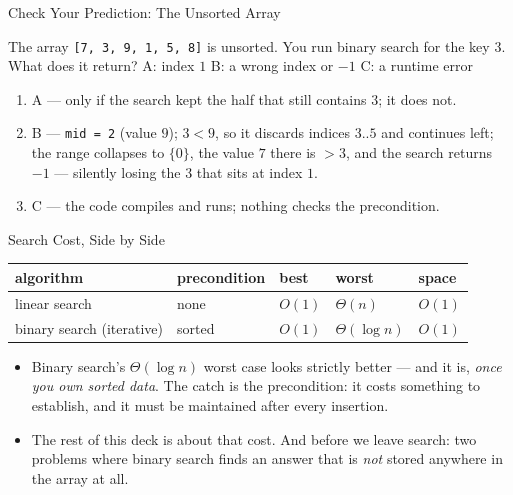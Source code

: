 \documentclass[aspectratio=169]{beamer}
\begin{document}
\begin{frame}{Check Your Prediction: The Unsorted Array}
  \begin{block}{The array \texttt{[7, 3, 9, 1, 5, 8]} is unsorted. You run
    binary search for the key $3$. What does it return?}
    A: index $1$ \quad B: a wrong index or $-1$ \quad C: a runtime error
  \end{block}
  \begin{enumerate}
    \item A --- only if the search kept the half that still contains $3$; it
      does not.
    \item B --- \texttt{mid = 2} (value $9$); $3 < 9$, so it discards indices
      $3..5$ and continues left; the range collapses to $\{0\}$, the value $7$
      there is $> 3$, and the search returns $-1$ --- silently losing the $3$
      that sits at index $1$.
    \item C --- the code compiles and runs; nothing checks the precondition.
  \end{enumerate}
\end{frame}

\begin{frame}{Search Cost, Side by Side}
  \begin{center}
  {\footnotesize
  \begin{tabular}{lllll}
    \toprule
    \textbf{algorithm} & \textbf{precondition} & \textbf{best} &
      \textbf{worst} & \textbf{space} \\
    \midrule
    linear search & none & $O(1)$ & $\Theta(n)$ & $O(1)$ \\
    binary search (iterative) & sorted & $O(1)$ & $\Theta(\log n)$ & $O(1)$ \\
    \bottomrule
  \end{tabular}}
  \end{center}
  \begin{itemize}
    \item Binary search's $\Theta(\log n)$ worst case looks strictly better
      --- and it is, \emph{once you own sorted data}. The catch is the
      precondition: it costs something to establish, and it must be
      maintained after every insertion.
    \item The rest of this deck is about that cost. And before we leave
      search: two problems where binary search finds an answer that is
      \emph{not} stored anywhere in the array at all.
  \end{itemize}
\end{frame}
\end{document}
